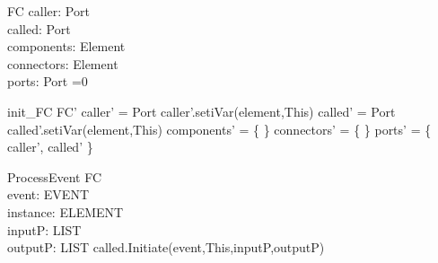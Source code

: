 \begin{schema}{FC}
caller:  Port \\
called: Port \\
components: \pset Element \\
connectors: \pset Element \\
ports: \pset Port 
=0
\end{schema}


\begin{zed}
init\_FC \sdef \lsch FC' \bbar caller' = \new Port \land caller'.setiVar(element,This) \land called' = \new Port \land called'.setiVar(element,This) \land  components' = \{ \} \land  connectors' = \{ \} \land ports' = \{ caller', called' \} \rsch  \end{zed}

\begin{schema}{ProcessEvent}
\Delta FC \\
event: EVENT \\
instance: ELEMENT \\
inputP: LIST \\
outputP: LIST 
\where called.Initiate(event,This,inputP,outputP)
\end{schema}
